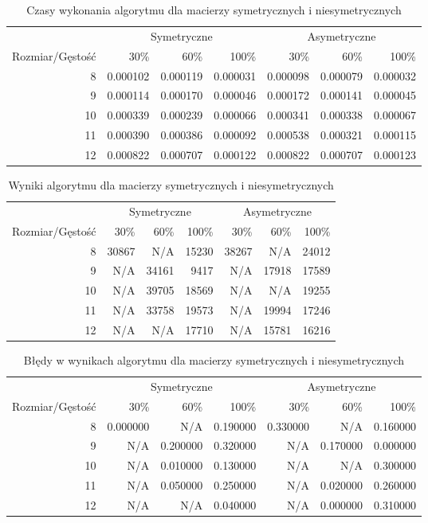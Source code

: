 \begin{table}[ht]
\centering
\begin{tabular}{rrrrrrr}
\toprule
 & \multicolumn{3}{c}{Symetryczne} & \multicolumn{3}{c}{Asymetryczne} \\
Rozmiar/Gęstość & 30\% & 60\% & 100\% & 30\% & 60\% & 100\% \\
\midrule
8 & 0.000102 & 0.000119 & 0.000031 & 0.000098 & 0.000079 & 0.000032 \\
9 & 0.000114 & 0.000170 & 0.000046 & 0.000172 & 0.000141 & 0.000045 \\
10 & 0.000339 & 0.000239 & 0.000066 & 0.000341 & 0.000338 & 0.000067 \\
11 & 0.000390 & 0.000386 & 0.000092 & 0.000538 & 0.000321 & 0.000115 \\
12 & 0.000822 & 0.000707 & 0.000122 & 0.000822 & 0.000707 & 0.000123 \\
\bottomrule
\end{tabular}
\caption{Czasy wykonania algorytmu dla macierzy symetrycznych i niesymetrycznych}
\label{tab:mean_time_nearest-neighbourresoult}
\end{table}
\begin{table}[ht]
\centering
\begin{tabular}{rrrrrrr}
\toprule
 & \multicolumn{3}{c}{Symetryczne} & \multicolumn{3}{c}{Asymetryczne} \\
Rozmiar/Gęstość & 30\% & 60\% & 100\% & 30\% & 60\% & 100\% \\
\midrule
8 & 30867 & N/A & 15230 & 38267 & N/A & 24012 \\
9 & N/A & 34161 & 9417 & N/A & 17918 & 17589 \\
10 & N/A & 39705 & 18569 & N/A & N/A & 19255 \\
11 & N/A & 33758 & 19573 & N/A & 19994 & 17246 \\
12 & N/A & N/A & 17710 & N/A & 15781 & 16216 \\
\bottomrule
\end{tabular}
\caption{Wyniki algorytmu dla macierzy symetrycznych i niesymetrycznych}
\label{tab:resoult_nearest-neighbourresoult}
\end{table}
\begin{table}[ht]
\centering
\begin{tabular}{rrrrrrr}
\toprule
 & \multicolumn{3}{c}{Symetryczne} & \multicolumn{3}{c}{Asymetryczne} \\
Rozmiar/Gęstość & 30\% & 60\% & 100\% & 30\% & 60\% & 100\% \\
\midrule
8 & 0.000000 & N/A & 0.190000 & 0.330000 & N/A & 0.160000 \\
9 & N/A & 0.200000 & 0.320000 & N/A & 0.170000 & 0.000000 \\
10 & N/A & 0.010000 & 0.130000 & N/A & N/A & 0.300000 \\
11 & N/A & 0.050000 & 0.250000 & N/A & 0.020000 & 0.260000 \\
12 & N/A & N/A & 0.040000 & N/A & 0.000000 & 0.310000 \\
\bottomrule
\end{tabular}
\caption{Błędy w wynikach algorytmu dla macierzy symetrycznych i niesymetrycznych}
\label{tab:error_nearest-neighbourresoult}
\end{table}
